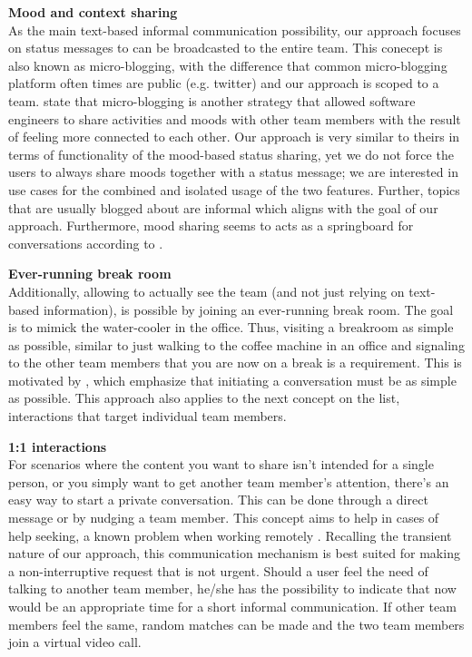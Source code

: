 \medskip\noindent\textbf{Mood and context sharing} \\
As the main text-based informal communication possibility, our approach focuses on status messages to can be broadcasted to the entire team. This conecept is also known as micro-blogging, with the difference that common micro-blogging platform often times are public (e.g. twitter) and our approach is scoped to a team. \textcite{dullemond2013fixing} state that micro-blogging is another strategy that allowed software engineers to share activities and moods with other team members with the result of feeling more connected to each other. Our approach is very similar to theirs in terms of functionality of the mood-based status sharing, yet we do not force the users to always share moods together with a status message; we are interested in use cases for the combined and isolated usage of the two features. Further, topics that are usually blogged about are informal \autocite{ehrlich2010microblogging} which aligns with the goal of our approach. Furthermore, mood sharing seems to acts as a springboard for conversations according to \textcite{church2010study}.

\medskip\noindent\textbf{Ever-running break room} \\
Additionally, allowing to actually see the team (and not just relying on text-based information), is possible by joining an ever-running break room. The goal is to mimick the water-cooler in the office. Thus, visiting a breakroom as simple as possible, similar to just walking to the coffee machine in an office and signaling to the other team members that you are now on a break is a requirement. This is motivated by \textcite{chang2007out}, which emphasize that initiating a conversation must be as simple as possible. This approach also applies to the next concept on the list, interactions that target individual team members.

\medskip\noindent\textbf{1:1 interactions} \\
For scenarios where the content you want to share isn't intended for a single person, or you simply want to get another team member's attention, there's an easy way to start a private conversation. This can be done through a direct message or by nudging a team member. This concept aims to help in cases of help seeking, a known problem when working remotely \autocite{herbsleb2003empirical}. Recalling the transient nature of our approach, this communication mechanism is best suited for making a non-interruptive request that is not urgent. Should a user feel the need of talking to another team member, he/she has the possibility to indicate that now would be an appropriate time for a short informal communication. If other team members feel the same, random matches can be made and the two team members join a virtual video call.


